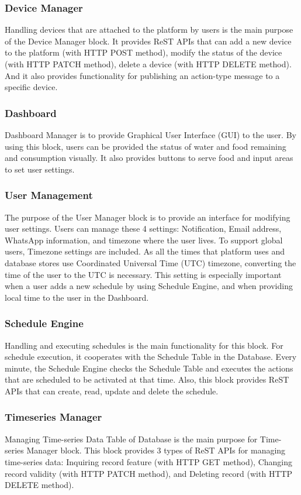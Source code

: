 \documentclass[conference]{IEEEtran}
\begin{document}
\subsubsection{Device Manager}
Handling devices that are attached to the platform by users is the main purpose of the Device Manager block. It provides ReST APIs that can add a new device to the platform (with HTTP POST method), modify the status of the device (with HTTP PATCH method), delete a device (with HTTP DELETE method). And it also provides functionality for publishing an action-type message to a specific device.

\subsubsection{Dashboard}
Dashboard Manager is to provide Graphical User Interface (GUI) to the user. By using this block, users can be provided the status of water and food remaining and consumption visually. It also provides buttons to serve food and input areas to set user settings.

\subsubsection{User Management}
The purpose of the User Manager block is to provide an interface for modifying user settings. Users can manage these 4 settings: Notification, Email address, WhatsApp information, and timezone where the user lives.  To support global users, Timezone settings are included. As all the times that platform uses and database stores use Coordinated Universal Time (UTC) timezone, converting the time of the user to the UTC is necessary. This setting is especially important when a user adds a new schedule by using Schedule Engine, and when providing local time to the user in the Dashboard.

\subsubsection{Schedule Engine}
Handling and executing schedules is the main functionality for this block. For schedule execution, it cooperates with the Schedule Table in the Database. Every minute, the Schedule Engine checks the Schedule Table and executes the actions that are scheduled to be activated at that time. Also, this block provides ReST APIs that can create, read, update and delete the schedule.

\subsubsection{Timeseries Manager}
Managing Time-series Data Table of Database is the main purpose for Time-series Manager block. This block provides 3 types of ReST APIs for managing time-series data: Inquiring record feature (with HTTP GET method), Changing record validity (with HTTP PATCH method), and Deleting record (with HTTP DELETE method).
\end{document}
